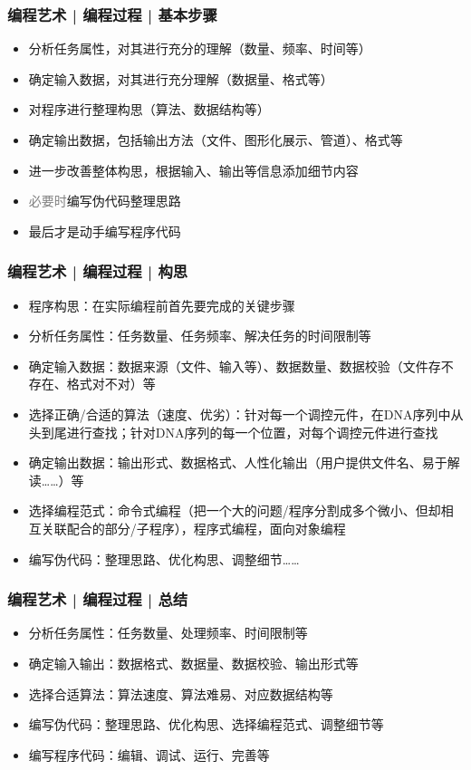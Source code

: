 \begin{frame}
  \frametitle{编程艺术 | 编程过程 | \alert{基本步骤}}
  \begin{itemize}
    \item 分析任务属性，对其进行充分的理解（数量、频率、时间等）
    \item 确定输入数据，对其进行充分理解（数据量、格式等）
    \item 对程序进行整理构思（算法、数据结构等）
    \item 确定输出数据，包括输出方法（文件、图形化展示、管道）、格式等
    \item 进一步改善整体构思，根据输入、输出等信息添加细节内容
    \item \textcolor{gray}{必要时}编写伪代码整理思路
    \item \alert{最后}才是动手编写程序代码
  \end{itemize}
\end{frame}

\begin{frame}
  \frametitle{编程艺术 | 编程过程 | \alert{构思}}
  \begin{itemize}
    \item 程序构思：在实际编程前首先要完成的关键步骤
    \item 分析任务属性：任务数量、任务频率、解决任务的时间限制等
    \item 确定输入数据：数据来源（文件、输入等）、数据数量、数据校验（文件存不存在、格式对不对）等
    \item 选择正确/合适的算法（速度、优劣）：针对每一个调控元件，在DNA序列中从头到尾进行查找；针对DNA序列的每一个位置，对每个调控元件进行查找
    \item 确定输出数据：输出形式、数据格式、人性化输出（用户提供文件名、易于解读……）等
    \item 选择编程范式：命令式编程（把一个大的问题/程序分割成多个微小、但却相互关联配合的部分/子程序），程序式编程，面向对象编程
    \item 编写伪代码：整理思路、优化构思、调整细节……
  \end{itemize}
\end{frame}

\begin{frame}
  \frametitle{编程艺术 | 编程过程 | \alert{总结}}
  \begin{itemize}
    \item 分析任务属性：任务数量、处理频率、时间限制等
    \item 确定输入输出：数据格式、数据量、数据校验、输出形式等
    \item 选择合适算法：算法速度、算法难易、对应数据结构等
    \item 编写伪代码：整理思路、优化构思、选择编程范式、调整细节等
    \item 编写程序代码：编辑、调试、运行、完善等
  \end{itemize}
\end{frame}

